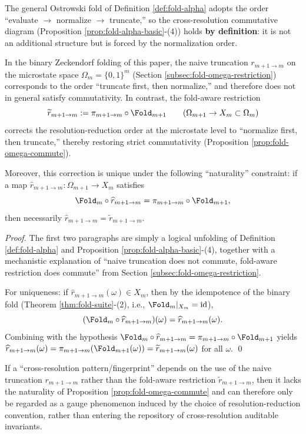 \begin{theorem}\label{thm:normalize-then-truncate-functorial}
The general Ostrowski fold of Definition \ref{def:fold-alpha} adopts the order ``evaluate \(\to\) normalize \(\to\) truncate,'' so the cross-resolution commutative diagram (Proposition \ref{prop:fold-alpha-basic}-(4)) holds \textbf{by definition}: it is not an additional structure but is forced by the normalization order.
\par
In the binary Zeckendorf folding of this paper, the naive truncation \(r_{m+1\to m}\) on the microstate space \(\Omega_m=\{0,1\}^m\) (Section \ref{subsec:fold-omega-restriction}) corresponds to the order ``truncate first, then normalize,'' and therefore does not in general satisfy commutativity.
In contrast, the fold-aware restriction
\[
\widetilde r_{m+1\to m}:=\pi_{m+1\to m}\circ \Fold_{m+1}\qquad(\Omega_{m+1}\to X_m\subset\Omega_m)
\]
corrects the resolution-reduction order at the microstate level to ``normalize first, then truncate,'' thereby restoring strict commutativity (Proposition \ref{prop:fold-omega-commute}).
\par
Moreover, this correction is unique under the following ``naturality'' constraint: if a map \(\widehat r_{m+1\to m}:\Omega_{m+1}\to X_m\) satisfies
\[
\Fold_m\circ \widehat r_{m+1\to m}=\pi_{m+1\to m}\circ \Fold_{m+1},
\]
then necessarily \(\widehat r_{m+1\to m}=\widetilde r_{m+1\to m}\).
\end{theorem}

\begin{proof}
The first two paragraphs are simply a logical unfolding of Definition \ref{def:fold-alpha} and Proposition \ref{prop:fold-alpha-basic}-(4), together with a mechanistic explanation of ``naive truncation does not commute, fold-aware restriction does commute'' from Section \ref{subsec:fold-omega-restriction}.
\par
For uniqueness: if \(\widehat r_{m+1\to m}(\omega)\in X_m\), then by the idempotence of the binary fold (Theorem \ref{thm:fold-suite}-(2), i.e., \(\Fold_m|_{X_m}=\mathrm{id}\)),
\[
(\Fold_m\circ \widehat r_{m+1\to m})(\omega)=\widehat r_{m+1\to m}(\omega).
\]
Combining with the hypothesis \(\Fold_m\circ \widehat r_{m+1\to m}=\pi_{m+1\to m}\circ \Fold_{m+1}\) yields
\(
\widehat r_{m+1\to m}(\omega)=\pi_{m+1\to m}(\Fold_{m+1}(\omega))=\widetilde r_{m+1\to m}(\omega)
\)
for all \(\omega\). \qed
\end{proof}

\begin{corollary}\label{cor:multiscale-auditable-invariants}
If a ``cross-resolution pattern/fingerprint'' depends on the use of the naive truncation \(r_{m+1\to m}\) rather than the fold-aware restriction \(\widetilde r_{m+1\to m}\), then it lacks the naturality of Proposition \ref{prop:fold-omega-commute} and can therefore only be regarded as a gauge phenomenon induced by the choice of resolution-reduction convention, rather than entering the repository of cross-resolution auditable invariants.
\end{corollary}

